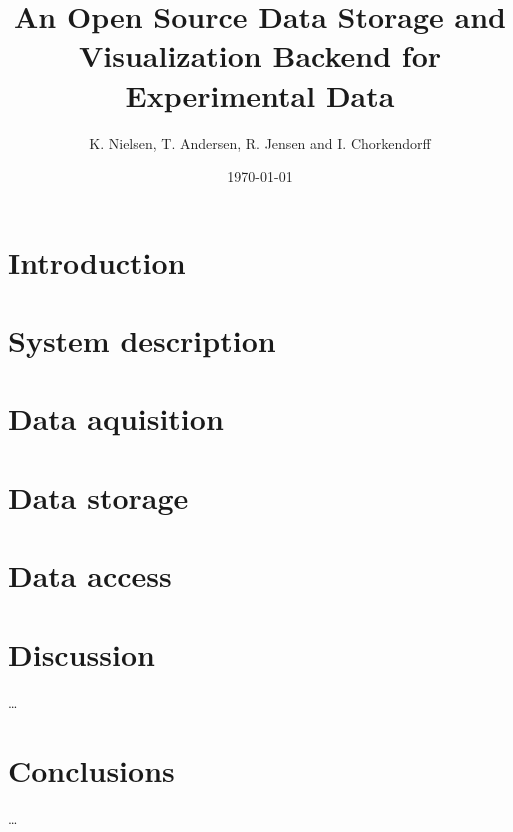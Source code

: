 \documentclass[12pt]{article}
\title{An Open Source Data Storage and Visualization Backend for Experimental
Data}
\author{K. Nielsen, T. Andersen, R. Jensen and I. Chorkendorff}
\date{\today}
\begin{document}
\doublespacing %
\maketitle

\begin{abstract}

\end{abstract}

\section{Introduction}


\section{System description}


\section{Data aquisition}


\section{Data storage}


\section{Data access}


\section{Discussion}
\ldots

\section{Conclusions}
\ldots

%
%
\end{document}
